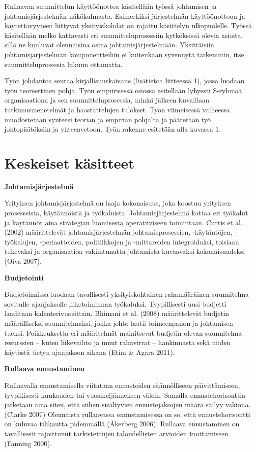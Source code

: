 \documentclass[12pt,a4paper,oneside,pdftex]{report}
\begin{document}
Rullaavan suunnittelun käyttöönottoa käsitellään työssä johtamisen ja johtamisjärjestelmän näkökulmasta. Esimerkiksi järjestelmän käyttöönottoon ja käytettävyyteen liittyvät yksityiskohdat on rajattu käsittelyn ulkopuolelle. Työssä käsitellään melko kattavasti eri suunnitteluprosessiin kytköksissä olevia asioita, sillä ne kuuluvat olennaisina osina johtamisjärjestelmään. Yksittäisiin johtamisjärjestelmän komponentteihin ei kuitenkaan syvennytä tarkemmin, itse suunnitteluprosessia lukuun ottamatta.

Työn johdantoa seuraa kirjallisuuskatsaus (lisätietoa liitteessä 1), jossa luodaan työn teoreettinen pohja. Työn empiirisessä osiossa esitellään lyhyesti S-ryhmää organisaationa ja sen suunnitteluprosessia, minkä jälkeen kuvaillaan tutkimusmenetelmät ja haastattelujen tulokset. Työn viimeisessä vaiheessa muodostetaan synteesi teorian ja empirian pohjalta ja päätetään työ johtopäätöksiin ja yhteenvetoon. Työn rakenne esitetään alla kuvassa 1.


\section{Keskeiset käsitteet}

\textbf{Johtamisjärjestelmä}

Yrityksen johtamisjärjestelmä on laaja kokonaisuus, joka koostuu yrityksen prosesseista, käytännöistä ja työkaluista. Johtamisjärjestelmä kattaa eri työkalut ja käytännöt aina strategian luomisesta operatiiviseen toimintaan. Curtis et al. (2002) määrittelevät johtamisjärjestelmän johtamisprosessien, -käytäntöjen, -työkalujen, -periaatteiden,  politiikkojen ja -mittareiden integroiduksi, toisiaan tukevaksi ja organisaation vakiintunutta johtamista kuvaavaksi kokonaisuudeksi (Oiva 2007).

\textbf{Budjetointi}

Budjetoinnissa luodaan tavallisesti yksityiskohtainen rahamääräinen suunnitelma sovitulle ajanjaksolle liiketoiminnan työkaluksi. Tyypillisesti uusi budjetti laaditaan kalenterivuosittain. Bhimani et al. (2008) määrittelevät budjetin määrälliseksi suunnitelmaksi, jonka johto laatii toimeenpanon ja johtamisen tueksi. Poikkeuksetta eri määritelmät mainitsevat budjetin olevan suunnitelma resurssien – kuten liikevaihto ja muut rahavirrat – hankinnasta sekä niiden käytöstä tietyn ajanjakson aikana (Etim & Agara 2011).

\textbf{Rullaava ennustaminen}

Rullaavalla ennustamisella viitataan ennusteiden säännölliseen päivittämiseen, tyypillisesti kuukauden tai vuosineljänneksen välein. Samalla ennustehorisonttia jatketaan aina siten, että siihen sisältyvien ennustejaksojen määrä säilyy vakiona. (Clarke 2007) Olennaista rullaavassa ennustamisessa on se, että ennustehorisontti on kuluvaa tilikautta pidemmällä (Åkerberg 2006). Rullaava ennustaminen on tavallisesti rajoittunut tarkistettujen taloudellisten arvioiden tuottamiseen (Fanning 2000).
\end{document}

